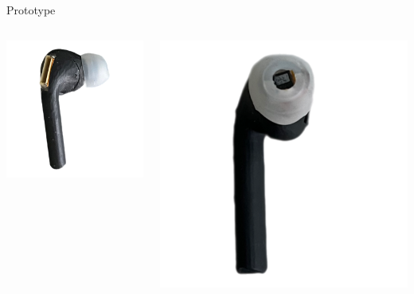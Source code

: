 \documentclass[en]{sdqbeamer}
\begin{document}
\begin{frame}{Prototype}
  \begin{columns}[T] %
    \begin{column}{.31\textwidth} %
      \includegraphics[width=0.9\linewidth]{../thesis-doc/images/prototype/Earpod_Side1.png} %
    \end{column}
    
    \begin{column}{.31\textwidth} %
      \includegraphics[width=0.9\linewidth]{../thesis-doc/images/prototype/Earpod_Front_2.pdf} %
    \end{column}


\end{columns}
\end{frame}
\end{document}

